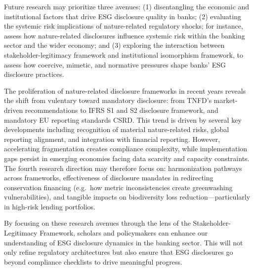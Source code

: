 \documentclass[
  authoryear]{elsarticle}
\begin{document}
Future research may prioritize three avenues: (1) disentangling the
economic and institutional factors that drive ESG disclosure quality in
banks; (2) evaluating the systemic risk implications of nature-related
regulatory shocks; for instance, assess how nature-related disclosures
influence systemic risk within the banking sector and the wider economy;
and (3) exploring the interaction between stakeholder-legitimacy
framework and institutional isomorphism framework, to assess how
coercive, mimetic, and normative pressures shape banks' ESG disclosure
practices.

The proliferation of nature-related disclosure frameworks in recent
years reveals the shift from vulentary toward mandatory disclosure: from
TNFD's market-driven recommendations to IFRS S1 and S2 disclosure
framework, and mandatory EU reporting standards CSRD. This trend is
driven by several key developments including recognition of material
nature-related risks, global reporting alignment, and integration with
financial reporting. However, accelerating fragmentation creates
compliance complexity, while implementation gaps persist in emerging
economies facing data scarcity and capacity constraints. The fourth
research direction may therefore focus on: harmonization pathways across
frameworks, effectiveness of disclosure mandates in redirecting
conservation financing (e.g.~how metric inconsistencies create
greenwashing vulnerabilities), and tangible impacts on biodiversity loss
reduction---particularly in high-risk lending portfolios.\hspace{0pt}

By focusing on these research avenues through the lens of the
Stakeholder-Legitimacy Framework, scholars and policymakers can enhance
our understanding of ESG disclosure dynamics in the banking sector. This
will not only refine regulatory architectures but also ensure that ESG
disclosures go beyond compliance checklists to drive meaningful
progress.


\renewcommand\refname{Reference}
  
\end{document}
